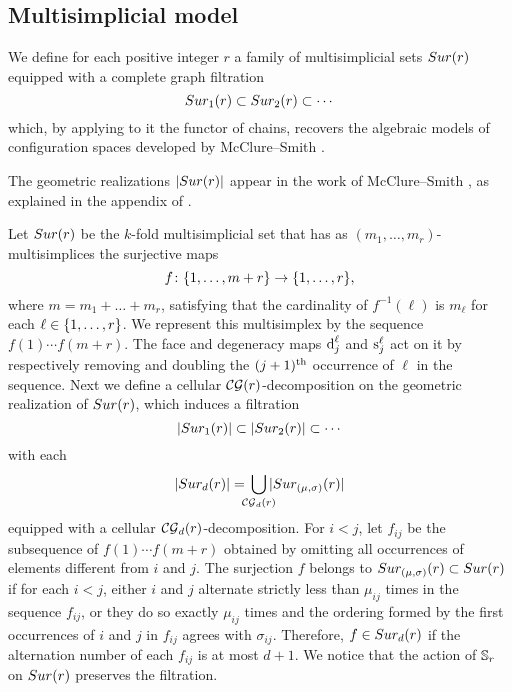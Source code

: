 \subsection{Multisimplicial model}\label{ss:surjection model}

We define for each positive integer $r$ a family of multisimplicial sets $Sur(r)$ equipped with a complete graph filtration
\[
 Sur_{1}(r) \subset Sur_{2}(r) \subset \dotsb
\]
which, by applying to it the functor of chains, recovers the algebraic models of configuration spaces developed by McClure--Smith \cite{mcluresmith2004geomodel}.

The geometric realizations $\lvert Sur(r)\rvert$ appear in the work of McClure--Smith \cite{mcclure2003multivariable}, as explained in the appendix of \cite{salvatore2009deligne}.

Let $Sur(r)$ be the $k$-fold multisimplicial set that has as $(m_1,\dots,m_r)$-multisimplices
the surjective maps
\[
f \colon \{1,\dots,m+r\} \to \{1,\dots,r\},
\]
where $m = m_1+\dots+m_r$, satisfying that the cardinality of $f^{-1}(\ell)$ is $m_\ell$ for each $\ell \in \{1,\dots,r\}$.
We represent this multisimplex by the sequence $f(1) \dotsm f(m+r)$.
The face and degeneracy maps $\operatorname{d}^\ell_j$ and $\operatorname{s}^\ell_j$ act on it by respectively removing and doubling the $(j+1)^{\mathrm{th}}$ occurrence of $\ell$ in the sequence.
Next we define a cellular $\mathcal{CG}(r)$-decomposition on the geometric realization of $Sur(r)$, which induces a filtration
\[
\lvert Sur_1(r)\rvert \subset \lvert Sur_2(r)\rvert \subset \dotsb
\]
with each
\[
\bars{\sur_d(r)} = \, \bigcup_{\mathclap{\CG_d(r)}} \, \bars{\sur_{(\mu,\sigma)}(r)}
\]
equipped with a cellular $\mathcal{CG}_d(r)$-decomposition.
For $i<j$, let $f_{ij}$ be the subsequence of $f(1) \dotsm f(m+r)$ obtained by omitting all occurrences of elements different from $i$ and $j$.
The surjection $f$ belongs to $Sur_{(\mu,\sigma)}(r) \subset Sur(r)$ if for each $i<j$, either $i$ and $j$ alternate strictly less than $\mu_{ij}$ times in the sequence $f_{ij}$, or they do so exactly $\mu_{ij}$ times and the ordering formed by the first occurrences of $i$ and $j$ in $f_{ij}$ agrees with $\sigma_{ij}$.
Therefore, $f \in Sur_{d}(r)$ if the alternation number of each $f_{ij}$ is at most $d+1$.
We notice that
the action of $\mathbb{S}_r$ on $Sur(r)$ preserves the filtration.


